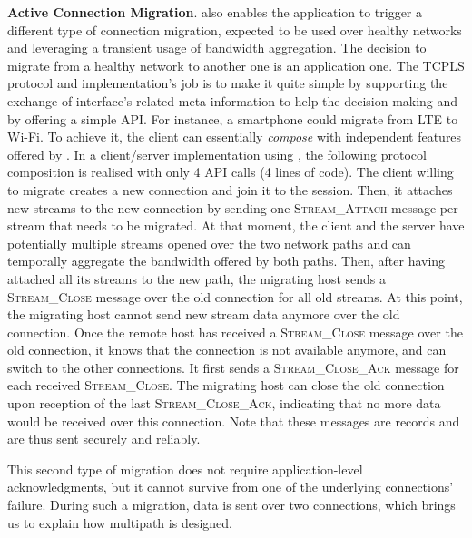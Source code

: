 \textbf{Active Connection Migration}. \tcpls also enables the application
to trigger a different type of connection migration, expected to be used over
healthy networks and leveraging a transient usage of bandwidth aggregation. The
decision to migrate from a healthy network to another one is an application one.
The TCPLS protocol and implementation's job is to make it quite simple by
supporting the exchange of interface's related meta-information to help the decision
making and by offering a simple API.
For instance, a smartphone could migrate from LTE to Wi-Fi.
To achieve it, the client can essentially \textit{compose} with independent
features offered by \tcpls. In a client/server implementation using \tcpls, the
following protocol composition is realised with only 4 API calls (4 lines of
code). The client willing to migrate creates a new \tcp connection and join it to the \tcpls
session. Then, it attaches new streams to the new
connection by sending one \textsc{Stream\_Attach} message per stream that needs
to be migrated. At that moment, the client and the server have potentially
multiple streams opened over the two network paths and can temporally aggregate
the bandwidth offered by both paths. Then, after having attached
all its streams to the new path, the migrating host sends a
\textsc{Stream\_Close} message over the old \tcp connection for all old streams.
At this point, the migrating host cannot send new stream data anymore over the
old connection. Once the remote host has received a \textsc{Stream\_Close}
message over the old \tcp connection, it knows that the connection is not
available anymore, and can switch to the other connections. It first sends a
\textsc{Stream\_Close\_Ack} message for each received \textsc{Stream\_Close}.
The migrating host can close the old connection upon reception of the last
\textsc{Stream\_Close\_Ack}, indicating that no more data would be received over
this connection. Note that these messages are \tls records and are thus sent
securely and reliably.%

This second type of migration does not require application-level
acknowledgments, but it cannot survive from one of the
underlying connections' failure. During such a migration, data is sent over two
connections, which brings us to explain how multipath is designed.

